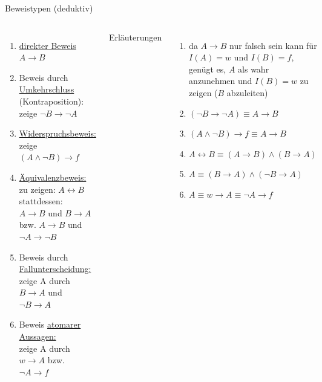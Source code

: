 \begin{frame}[shrink=5]{Beweistypen (deduktiv)}
	\begin{columns}
			\begin{enumerate}
				\item \underline{direkter Beweis} $A \rightarrow B$
				\item Beweis durch \underline{Umkehrschluss} (Kontraposition): zeige $\neg B \rightarrow \neg A$
				\item \underline{Widerspruchsbeweis:} zeige $(A \land \neg B) \rightarrow f$
				\item \underline{Äquivalenzbeweis:}\\
				zu zeigen: $A \leftrightarrow B$\\
				stattdessen:\\
				$A \rightarrow B$ und $B \rightarrow A$ bzw. $A \rightarrow B$ und $\neg A \rightarrow \neg B$
				\item Beweis durch \underline{Fallunterscheidung:}\\
				zeige A durch $B \rightarrow A$ und $\neg B \rightarrow A$
				\item Beweis \underline{atomarer Aussagen:}\\
				zeige A durch $w \rightarrow A$ bzw. $\neg A \rightarrow f$
			\end{enumerate}
			Erläuterungen
			\begin{enumerate}
				\item da $A \rightarrow B$ nur falsch sein kann für $I(A)=w$ und $I(B)=f$, genügt es, $A$ als wahr anzunehmen und $I(B)=w$ zu zeigen ($B$ abzuleiten)
				\item $(\neg B \rightarrow \neg A) \equiv A \rightarrow B$
				\item $(A \land \neg B) \rightarrow f \equiv A \rightarrow B$
				\item $A \leftrightarrow B \equiv (A \rightarrow B) \land (B \rightarrow A)$
				\item $A \equiv (B \rightarrow A) \land (\neg B \rightarrow A)$
				\item $A \equiv w \rightarrow A \equiv \neg A \rightarrow f$
			\end{enumerate}
	\end{columns}
\end{frame}



